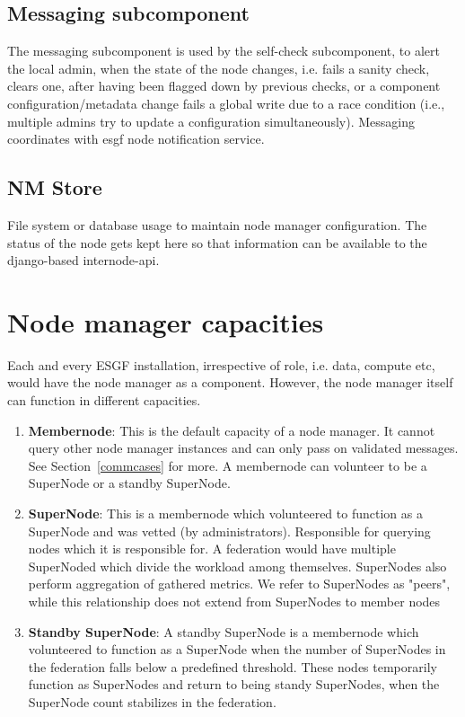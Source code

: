 \documentclass[oneside,12pt]{memoir}
\begin{document}
\subsection{Messaging subcomponent}

The messaging subcomponent is used by the self-check subcomponent, to alert the local admin, when the state of the node changes, i.e. fails a sanity check,  clears one, after having been flagged down by previous checks, or a component configuration/metadata change fails a global write due to a race condition (i.e., multiple admins try to update a configuration simultaneously).  
  Messaging coordinates with esgf node notification service.

\subsection{NM Store}

File system or database usage to maintain node manager configuration.  The status of the node gets kept here so that information can be available to the django-based internode-api.



\section{Node manager capacities}
Each and every ESGF installation, irrespective of role, i.e. data, compute etc, would have the node manager as a component.  However, the node manager itself can function in different capacities. 
\begin{enumerate}
\item \textbf{Membernode}: This is the default capacity of a node manager. It cannot query other node manager instances and can only pass on validated messages. See Section~\ref{commcases} for more. A membernode can volunteer to be a SuperNode or a standby SuperNode.
\item \textbf{SuperNode}: This is a membernode which volunteered to function as a SuperNode and was vetted (by administrators). Responsible for querying nodes which it is responsible for.  A federation would have multiple SuperNoded which divide the workload among themselves. SuperNodes also perform aggregation of gathered metrics.  We refer to SuperNodes as "peers", while this relationship does not extend from SuperNodes to member nodes
\item \textbf{Standby SuperNode}: A standby SuperNode is a membernode which volunteered to function as a SuperNode when the number of SuperNodes in the federation falls below a predefined threshold. These nodes temporarily function as SuperNodes and return to being standy SuperNodes, when the SuperNode count stabilizes in the federation.
\end{enumerate}
\end{document}
